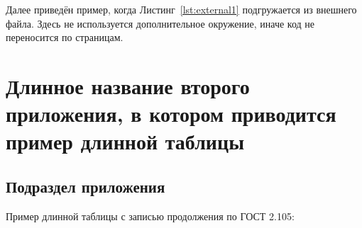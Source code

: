 Далее приведён пример, когда Листинг~\ref{lst:external1} подгружается 
из внешнего файла. Здесь не используется дополнительное окружение, 
иначе код не переносится по страницам.
\begingroup
\captiondelim{ } %

\endgroup





\chapter{Длинное название второго приложения, в котором приводится пример длинной таблицы}\label{app:C}

\section{Подраздел приложения}\label{app:C1}

Пример длинной таблицы с записью продолжения по ГОСТ 2.105:

